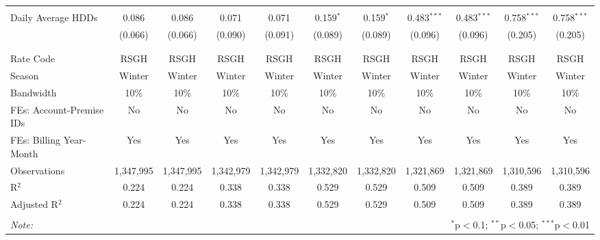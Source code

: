 \begin{table}[!htbp]
\begin{tabular}{@{\extracolsep{5pt}}lcccccccccc}
  & & & & & & & & & & \\ 
 Daily Average HDDs & 0.086 & 0.086 & 0.071 & 0.071 & 0.159$^{*}$ & 0.159$^{*}$ & 0.483$^{***}$ & 0.483$^{***}$ & 0.758$^{***}$ & 0.758$^{***}$ \\ 
  & (0.066) & (0.066) & (0.090) & (0.091) & (0.089) & (0.089) & (0.096) & (0.096) & (0.205) & (0.205) \\ 
  & & & & & & & & & & \\ 
\hline \\[-1.8ex] 
Rate Code & RSGH & RSGH & RSGH & RSGH & RSGH & RSGH & RSGH & RSGH & RSGH & RSGH \\ 
Season & Winter & Winter & Winter & Winter & Winter & Winter & Winter & Winter & Winter & Winter \\ 
Bandwidth & 10\% & 10\% & 10\% & 10\% & 10\% & 10\% & 10\% & 10\% & 10\% & 10\% \\ 
FEs: Account-Premise IDs & No & No & No & No & No & No & No & No & No & No \\ 
FEs: Billing Year-Month & Yes & Yes & Yes & Yes & Yes & Yes & Yes & Yes & Yes & Yes \\ 
Observations & 1,347,995 & 1,347,995 & 1,342,979 & 1,342,979 & 1,332,820 & 1,332,820 & 1,321,869 & 1,321,869 & 1,310,596 & 1,310,596 \\ 
R$^{2}$ & 0.224 & 0.224 & 0.338 & 0.338 & 0.529 & 0.529 & 0.509 & 0.509 & 0.389 & 0.389 \\ 
Adjusted R$^{2}$ & 0.224 & 0.224 & 0.338 & 0.338 & 0.529 & 0.529 & 0.509 & 0.509 & 0.389 & 0.389 \\ 
\hline 
\hline \\[-1.8ex] 
\textit{Note:}  & \multicolumn{10}{r}{$^{*}$p$<$0.1; $^{**}$p$<$0.05; $^{***}$p$<$0.01} \\ 
\end{tabular} 
\end{table} 
